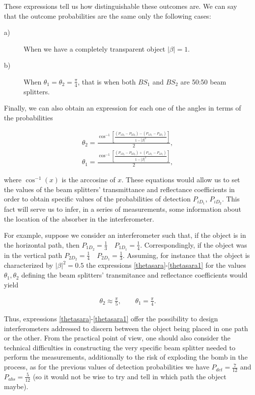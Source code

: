 \documentclass[12pt]{book}
\begin{document}
These expressions tell us how distinguishable these outcomes are.  We can say that the outcome probabilities are the same only the following cases:

\begin{description}

\item[a)] When we have a completely transparent object $|\beta|=1$.

\item[b)] When $\theta_{1}=\theta_{2}=\frac{\pi}{4}$, that is when both $BS_{1}$ and $BS_{2}$ are 50:50 beam splitters.
\end{description}

Finally, we can also obtain an expression for each one of the angles in terms of the probabilities


\begin{align}
\theta_{2}=\displaystyle \frac{\cos^{-1}\left[\frac{(P_{1D_{2}}-P_{2D_{2}})-(P_{1D_{1}}-P_{2D_{1}})}{1-|\beta|^2}\right]}{2},\label{thetasara}\\
\theta_{1}=\displaystyle \frac{\cos^{-1}\left[\frac{(P_{1D_{2}}-P_{2D_{2}})+(P_{1D_{1}}-P_{1D_{1}})}{1-|\beta|^2}\right]}{2}\label{thetasara1},
\end{align}


where $\cos^{-1}(x)$ is the arccosine of $x$. These equations would allow us to set the values of the beam splitters' transmittance and reflectance coefficients in order to obtain specific values of the probabilities of detection $P_{iD_{1}}$, $P_{iD_{2}}$. This fact will serve us to infer, in a series of measurements, some information about the location of the absorber in the interferometer.  

For example, suppose we consider an interferometer such that, if the object is in the horizontal path, then $P_{1D_{2}}=\frac{1}{3} \quad P_{1D_{1}}=\frac{1}{4}$. Correspondingly,  if the object was in the vertical path $P_{2D_{2}}=\frac{1}{4} \quad P_{2D_{1}}=\frac{1}{3}$. Assuming, for instance that the object is characterized by $|\beta|^{2}=0.5$ the expressions \ref{thetasara}-\ref{thetasara1} for the values $\theta_{1},\theta_{2}$ defining the beam splitters' transmitance and reflectance coefficients would yield

\begin{align*}
\theta_{2} \approx \frac{\pi}{5},\qquad \theta_{1} = \frac{\pi}{4}.
\end{align*}

Thus, expressions \ref{thetasara}-\ref{thetasara1} offer the possibility to design interferometers addressed to discern between the object being placed in one path or the other. From the practical point of view, one should also consider the technical difficulties in constructing the very specific beam splitter needed to perform the measurements, additionally to the risk of exploding the bomb in the process, as for the previous values of detection probabilities we have $P_{det}=\frac{7}{12}$ and $P_{abs}=\frac{5}{12}$ (so it would not be wise to try and tell in which path the object maybe).
 
\end{document}
